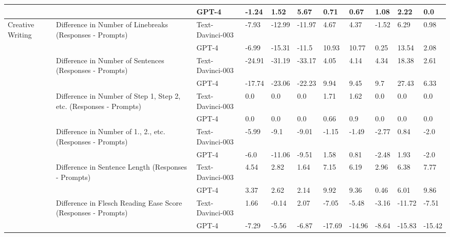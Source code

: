 \begin{tabular}{x{0.75cm}|x{1.5cm}|x{0.75cm}|x{0.75cm}|x{0.75cm}|x{0.75cm}|x{0.75cm}|x{0.75cm}|x{0.75cm}|x{0.75cm}|x{0.75cm}}
\hline
 &  & GPT-4 & -1.24 & 1.52 & 5.67 & 0.71 & 0.67 & 1.08 & 2.22 & 0.0 \\
\hline
Creative Writing & Difference in Number of Linebreaks (Responses - Prompts) & Text-Davinci-003 & -7.93 & -12.99 & -11.97 & 4.67 & 4.37 & -1.52 & 6.29 & 0.98 \\
\hline
 &  & GPT-4 & -6.99 & -15.31 & -11.5 & 10.93 & 10.77 & 0.25 & 13.54 & 2.08 \\
\hline
 & Difference in Number of Sentences (Responses - Prompts) & Text-Davinci-003 & -24.91 & -31.19 & -33.17 & 4.05 & 4.14 & 4.34 & 18.38 & 2.61 \\
\hline
 &  & GPT-4 & -17.74 & -23.06 & -22.23 & 9.94 & 9.45 & 9.7 & 27.43 & 6.33 \\
\hline
 & Difference in Number of Step 1, Step 2, etc. (Responses - Prompts) & Text-Davinci-003 & 0.0 & 0.0 & 0.0 & 1.71 & 1.62 & 0.0 & 0.0 & 0.0 \\
\hline
 &  & GPT-4 & 0.0 & 0.0 & 0.0 & 0.66 & 0.9 & 0.0 & 0.0 & 0.0 \\
\hline
 & Difference in Number of 1., 2., etc. (Responses - Prompts) & Text-Davinci-003 & -5.99 & -9.1 & -9.01 & -1.15 & -1.49 & -2.77 & 0.84 & -2.0 \\
\hline
 &  & GPT-4 & -6.0 & -11.06 & -9.51 & 1.58 & 0.81 & -2.48 & 1.93 & -2.0 \\
\hline
 & Difference in Sentence Length (Responses - Prompts) & Text-Davinci-003 & 4.54 & 2.82 & 1.64 & 7.15 & 6.19 & 2.96 & 6.38 & 7.77 \\
\hline
 &  & GPT-4 & 3.37 & 2.62 & 2.14 & 9.92 & 9.36 & 0.46 & 6.01 & 9.86 \\
\hline
 & Difference in Flesch Reading Ease Score (Responses - Prompts) & Text-Davinci-003 & 1.66 & -0.14 & 2.07 & -7.05 & -5.48 & -3.16 & -11.72 & -7.51 \\
\hline
 &  & GPT-4 & -7.29 & -5.56 & -6.87 & -17.69 & -14.96 & -8.64 & -15.83 & -15.42 \\
\hline
\bottomrule
\end{tabular}
